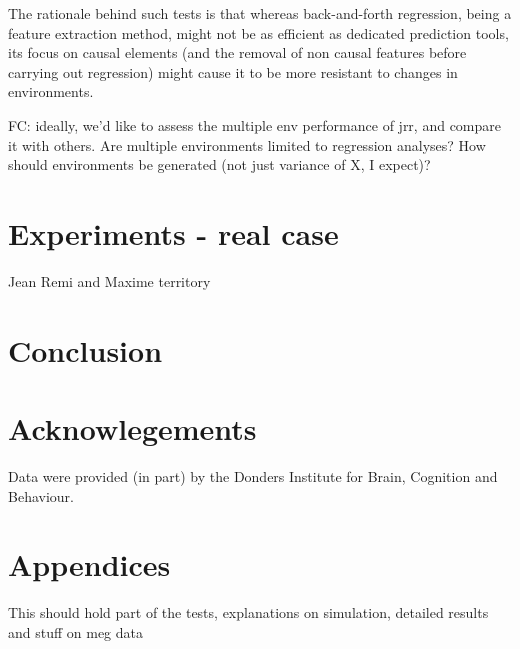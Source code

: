 \documentclass{article}
\begin{document}
The rationale behind such tests is that whereas back-and-forth regression, being a feature extraction method, might not be as efficient as dedicated prediction tools, its focus on causal elements (and the removal of non causal features before carrying out regression) might cause it to be more resistant to changes in environments.

FC: ideally, we'd like to assess the multiple env performance of jrr, and compare it with others.
%
Are multiple environments limited to regression analyses? How should environments be generated (not just variance of X, I expect)?

\section{Experiments - real case}
Jean Remi and Maxime territory



\section{Conclusion}

\section{Acknowlegements}
Data were provided (in part) by the Donders Institute for Brain, Cognition and Behaviour.

\clearpage
\newpage




\section{Appendices}

This should hold part of the tests, explanations on simulation, detailed results and stuff on meg data
\end{document}
